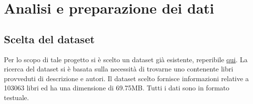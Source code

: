 \documentclass[12pt,oneside]{article}
\begin{document}
\section{Analisi e preparazione dei dati}
    \begin{enumerate}
    \subsection{Scelta del dataset}
    \begin{justify}
    Per lo scopo di tale progetto si è scelto un dataset già esistente, reperibile \href{https://www.kaggle.com/datasets/elvinrustam/books-dataset}{qui}. La ricerca del dataset si è basata sulla necessità di trovarne uno contenente libri provveduti di descrizione e autori. Il dataset scelto fornisce informazioni relative a 103063 libri ed ha una dimensione di 69.75MB. Tutti i dati sono in formato testuale.
    \end{justify}
    \end{enumerate}
\end{document}

